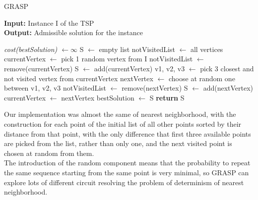 \begin{algorithm}
	\caption{GRASP}\label{GRASP method}
	\hspace*{\algorithmicindent} \textbf{Input:} Instance I of the TSP \\
	\hspace*{\algorithmicindent} \textbf{Output:} Admissible solution for the instance
    \begin{algorithmic}[1]
    		\State \textit{cost(bestSolution) $\leftarrow \infty$}
			\State S $\leftarrow$ empty list
			\State notVisitedList $\leftarrow$ all vertices
			\State currentVertex $\leftarrow$ pick 1 random vertex from I
			\State notVisitedList $\leftarrow$ remove(currentVertex) 
			\State S $\leftarrow$ add(currentVertex)
				\State v1, v2, v3 $\leftarrow$ pick 3 closest and not visited vertex from currentVertex
				\State nextVertex $\leftarrow$ choose at random one between v1, v2, v3
				\State notVisitedList $\leftarrow$ remove(nextVertex) 
				\State S $\leftarrow$ add(nextVertex)
				\State currentVertex $\leftarrow$ nextVertex
			\EndFor
				\State bestSolution $\leftarrow$ S
			\EndIf
		\EndWhile 
		\State \textbf{return} S
    \end{algorithmic}
\end{algorithm}

Our implementation was almost the same of nearest neighborhood, with the construction for each point of the initial list of all other points sorted by their distance from that point, with the only difference that first three available points are picked from the list, rather than only one, and the next visited point is chosen at random from them. \\
The introduction of the random component means that the probability to repeat the same sequence starting from the same point is very minimal, so GRASP can explore lots of different circuit resolving the problem of determinism of nearest neighborhood. 

